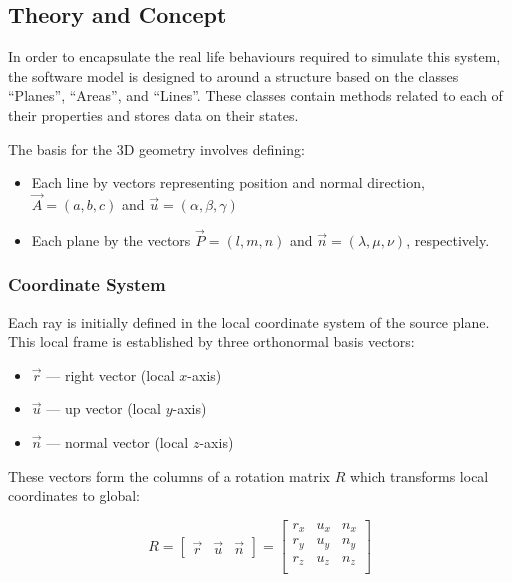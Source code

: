 \subsection{Theory and Concept}
In order to encapsulate the real life behaviours required to simulate this system, the software model is designed to around a structure based on the classes “Planes”, “Areas”, and “Lines”. These classes contain methods related to each of their properties and stores data on their states.    

The basis for the 3D geometry involves defining:
\begin{itemize}
    \item Each line by vectors representing position and normal direction, $ \vec{A} = (a,b,c)$ and $ \vec{u} = (\alpha, \beta, \gamma)$
    \item Each plane by the vectors $\vec{P} = (l,m,n) $ and $ \vec{n} = (\lambda, \mu, \nu)$, respectively.
\end{itemize}

\subsubsection{Coordinate System}

Each ray is initially defined in the local coordinate system of the source plane. This local frame is established by three orthonormal basis vectors:

\begin{itemize}
    \item $\vec{r}$ — right vector (local $x$-axis)
    \item $\vec{u}$ — up vector (local $y$-axis)
    \item $\vec{n}$ — normal vector (local $z$-axis)
\end{itemize}

These vectors form the columns of a rotation matrix $R$ which transforms local coordinates to global:

\begin{equation}
R = 
\begin{bmatrix}
\vec{r} & \vec{u} & \vec{n}
\end{bmatrix}
=
\begin{bmatrix}
r_x & u_x & n_x \\
r_y & u_y & n_y \\
r_z & u_z & n_z \\
\end{bmatrix}
\label{eq:rotation_matrix}
\end{equation}

